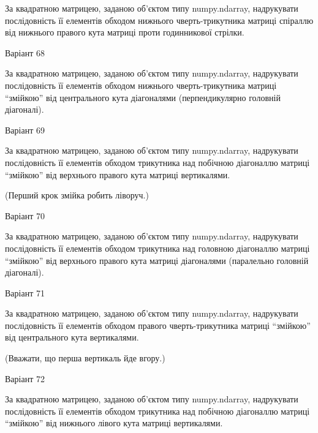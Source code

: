 \documentclass[11pt, ukrainian]{article}
\begin{document}
За квадратною матрицею, заданою об'єктом типу numpy.ndarray, надрукувати послідовність її елементів обходом нижнього чверть-трикутника матриці спіраллю від нижнього правого кута матриці проти годинникової стрілки.





{\Large \center  Варіант  68\par \bigskip\bigskip}

За квадратною матрицею, заданою об'єктом типу numpy.ndarray, надрукувати послідовність її елементів обходом нижнього чверть-трикутника матриці ``змійкою'' від центрального кута діагоналями (перпендикулярно головній діагоналі).





{\Large \center  Варіант  69\par \bigskip\bigskip}

За квадратною матрицею, заданою об'єктом типу numpy.ndarray, надрукувати послідовність її елементів обходом трикутника над побічною діагоналлю матриці ``змійкою'' від верхнього правого кута матриці вертикалями.


(Перший крок змійка робить ліворуч.)

{\Large \center  Варіант  70\par \bigskip\bigskip}

За квадратною матрицею, заданою об'єктом типу numpy.ndarray, надрукувати послідовність її елементів обходом трикутника над головною діагоналлю матриці ``змійкою'' від верхнього правого кута матриці діагоналями (паралельно головній діагоналі).





{\Large \center  Варіант  71\par \bigskip\bigskip}

За квадратною матрицею, заданою об'єктом типу numpy.ndarray, надрукувати послідовність її елементів обходом правого чверть-трикутника матриці ``змійкою'' від центрального кута вертикалями.


(Вважати, що перша вертикаль йде вгору.)


{\Large \center  Варіант  72\par \bigskip\bigskip}

За квадратною матрицею, заданою об'єктом типу numpy.ndarray, надрукувати послідовність її елементів обходом трикутника над побічною діагоналлю матриці ``змійкою'' від нижнього лівого кута матриці вертикалями.
\end{document}
